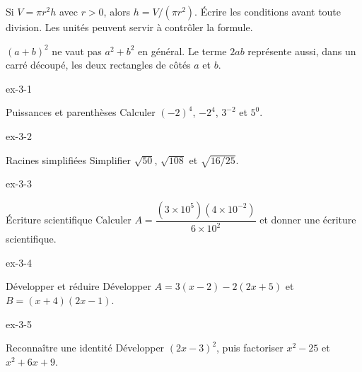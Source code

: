 \begin{savoirfaire}
Si $V=\pi r^2h$ avec $r>0$, alors $h=V/(\pi r^2)$. Écrire les conditions avant toute division. Les unités peuvent servir à contrôler la formule.
\end{savoirfaire}
\begin{attention}$(a+b)^2$ ne vaut pas $a^2+b^2$ en général. Le terme $2ab$ représente aussi, dans un carré découpé, les deux rectangles de côtés $a$ et $b$.\end{attention}
\clearpage{}
\begin{blocLivre}{ex-3-1}
\begin{exercice}[1]{Puissances et parenthèses}
Calculer $(-2)^4$, $-2^4$, $3^{-2}$ et $5^0$.
\end{exercice}
\end{blocLivre}
\begin{blocLivre}{ex-3-2}
\begin{exercice}[1]{Racines simplifiées}
Simplifier $\sqrt{50}$, $\sqrt{108}$ et $\sqrt{16/25}$.
\end{exercice}
\end{blocLivre}
\begin{blocLivre}{ex-3-3}
\begin{exercice}[1]{Écriture scientifique}
Calculer $A=\dfrac{(3\times10^5)(4\times10^{-2})}{6\times10^2}$ et donner une écriture scientifique.
\end{exercice}
\end{blocLivre}
\begin{blocLivre}{ex-3-4}
\begin{exercice}[1]{Développer et réduire}
Développer $A=3(x-2)-2(2x+5)$ et $B=(x+4)(2x-1)$.
\end{exercice}
\end{blocLivre}
\begin{blocLivre}{ex-3-5}
\begin{exercice}[1]{Reconnaître une identité}
Développer $(2x-3)^2$, puis factoriser $x^2-25$ et $x^2+6x+9$.
\end{exercice}
\end{blocLivre}

